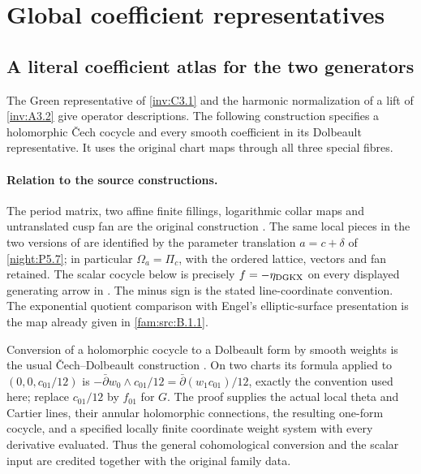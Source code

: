 \clearpage
\section{Global coefficient representatives}
\label{inv:section:coefficient-atlas}

\subsection{A literal coefficient atlas for the two generators}

The Green representative of \cref{inv:C3.1} and the harmonic
normalization of a lift of \cref{inv:A3.2} give operator descriptions.
The following construction specifies a holomorphic \v Cech
cocycle and every smooth coefficient in its Dolbeault representative.
It uses the original chart maps through all three special fibres.
\paragraph{Relation to the source constructions.}
The period matrix, two affine finite fillings, logarithmic collar maps
and untranslated cusp fan are the original construction
\cite[Sections~3--6]{AC2026}.  The same local pieces in the two
versions of \cite{DuEtAl2026v1,DuEtAl2026v2} are identified by the
parameter translation $a=c+\delta$ of \cref{night:P5.7}; in particular
$\Omega_a=\Pi_c$, with the ordered lattice, vectors and fan retained.
The scalar cocycle below is precisely $f=-\eta_{\rm DGKX}$ on every
displayed generating arrow in
\cite[Section~6.4, the scalar cocycle preceding Lemma~6.14]{DuEtAl2026v1}.
The minus sign is the stated line-coordinate convention.  The
exponential quotient comparison with Engel's elliptic-surface
presentation is the map already given in
\cref{fam:src:B.1.1}.

Conversion of a holomorphic cocycle to a Dolbeault form by smooth
weights is the usual \v Cech--Dolbeault construction
\cite[Theorem~3.1 and proof, p.~10]{AbateBracciSuwaTovena2010Atiyah}.
On two charts its formula applied to $(0,0,c_{01}/12)$ is
$-\bar\partial w_0\wedge c_{01}/12
=\bar\partial(w_1c_{01})/12$, exactly the convention used here;
replace $c_{01}/12$ by $f_{01}$ for $G$.
The proof supplies the actual local theta and Cartier lines, their
annular holomorphic connections, the resulting one-form cocycle,
and a specified locally finite coordinate weight system with every
derivative evaluated.  Thus the general cohomological conversion and
the scalar input are credited together with the original family data.

